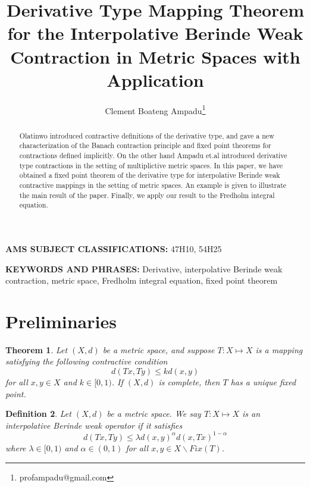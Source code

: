 \documentclass[11pt,letterpaper]{article}
\title{Derivative Type Mapping Theorem for the Interpolative Berinde Weak Contraction in Metric Spaces with Application}
\author[1]{Clement Boateng Ampadu\thanks{profampadu@gmail.com}}
\affil[1]{Independent Researcher, USA}
\newtheorem{thm}{Theorem}[section]
\newtheorem{defn}[thm]{Definition}
\begin{document}
 
 

  \maketitle
  

\begin{abstract}
\noindent  Olatinwo \cite{3} introduced contractive definitions of the derivative type, and gave a new characterization of the Banach contraction principle and fixed point theorems for contractions defined implicitly. On the other hand Ampadu et.al \cite{4} introduced derivative type contractions in the setting of multiplictive metric spaces. In this paper, we have obtained a fixed point theorem of the derivative type for interpolative Berinde weak contractive mappings\cite{2} in the setting of metric spaces. An example is given to illustrate the main result of the paper. Finally, we apply our result to the Fredholm integral equation.
\end{abstract}

\begin{flushleft}
\textbf {AMS SUBJECT CLASSIFICATIONS:}  47H10, 54H25  
\end{flushleft} 
\begin{flushleft}
\textbf{KEYWORDS AND PHRASES:} Derivative, interpolative Berinde weak contraction, metric space, Fredholm integral equation, fixed point theorem
\end{flushleft}


                          
               \hypersetup{linkcolor=blue}
             \tableofcontents
            
            

\section{\textbf{Preliminaries}}

\begin{thm} \cite{1} Let $(X,d)$ be a metric space, and suppose $T:X \mapsto X$ is a mapping satisfying the following contractive condition
$$d(Tx,Ty)\leq k d(x,y)$$ for all $x,y\in X$ and $k\in [0,1)$. If $(X,d)$ is complete, then $T$ has a unique fixed point.
\end{thm}

\begin{defn} \cite{2} Let $(X,d)$ be a metric space. We say $T:X\mapsto X$ is an interpolative Berinde weak operator if it satisfies
$$d(Tx,Ty)\leq \lambda d(x,y)^{\alpha} d(x,Tx)^{1-\alpha}$$ where $\lambda \in [0,1)$ and $\alpha \in (0,1)$ for all $x,y\in X\backslash Fix(T)$.
\end{defn}
\end{document}
